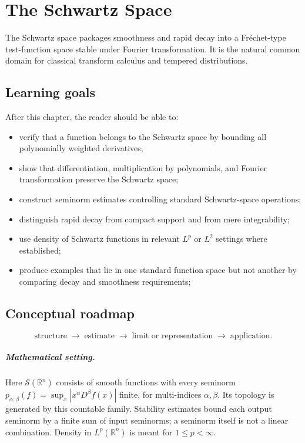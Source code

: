 \chapter{The Schwartz Space}
\label{ch:iii14}

The Schwartz space packages smoothness and rapid decay into a Fréchet-type test-function space stable under Fourier transformation. It is the natural common domain for classical transform calculus and tempered distributions.

\section*{Learning goals}
After this chapter, the reader should be able to:
\begin{itemize}
\item verify that a function belongs to the Schwartz space by bounding all polynomially weighted derivatives;
\item show that differentiation, multiplication by polynomials, and Fourier transformation preserve the Schwartz space;
\item construct seminorm estimates controlling standard Schwartz-space operations;
\item distinguish rapid decay from compact support and from mere integrability;
\item use density of Schwartz functions in relevant \(L^p\) or \(L^2\) settings where established;
\item produce examples that lie in one standard function space but not another by comparing decay and smoothness requirements;
\end{itemize}
\section*{Conceptual roadmap}
\[
\boxed{\text{structure}\;\longrightarrow\;\text{estimate}\;\longrightarrow\;\text{limit or representation}\;\longrightarrow\;\text{application}.}
\]

\paragraph{Mathematical setting.}
Here $\mathcal S(\mathbb R^n)$ consists of smooth functions with every seminorm $p_{\alpha,\beta}(f)=\sup_x|x^\alpha D^\beta f(x)|$ finite, for multi-indices $\alpha,\beta$. Its topology is generated by this countable family. Stability estimates bound each output seminorm by a finite sum of input seminorms; a seminorm itself is not a linear combination. Density in $L^p(\mathbb R^n)$ is meant for $1\le p<\infty$.


